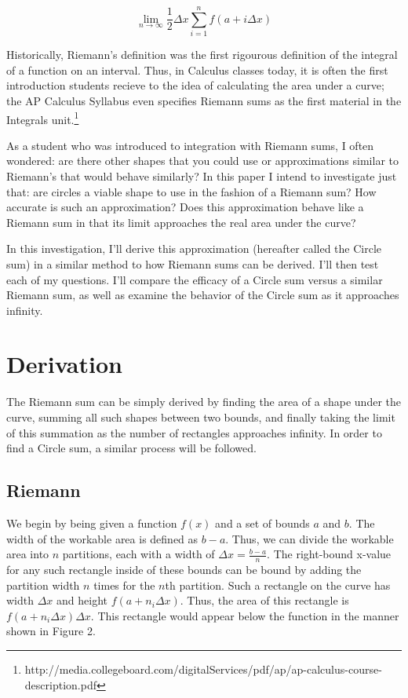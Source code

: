 \documentclass{article}
\begin{document}
    \[ \displaystyle\lim_{n \to \infty}\frac{1}{2}\Delta x\sum_{i=1}^n f(a+i\Delta x) \]

    Historically, Riemann's definition was the first rigourous definition of the integral of a function on an interval. Thus, in Calculus classes today, it is often the first introduction students recieve to the idea of calculating the area under a curve; the AP Calculus Syllabus even specifies Riemann sums as the first material in the Integrals unit.\footnote{http://media.collegeboard.com/digitalServices/pdf/ap/ap-calculus-course-description.pdf}

    As a student who was introduced to integration with Riemann sums, I often wondered: are there other shapes that you could use or approximations similar to Riemann's that would behave similarly? In this paper I intend to investigate just that: are circles a viable shape to use in the fashion of a Riemann sum? How accurate is such an approximation? Does this approximation behave like a Riemann sum in that its limit approaches the real area under the curve?

    In this investigation, I'll derive this approximation (hereafter called the Circle sum) in a similar method to how Riemann sums can be derived. I'll then test each of my questions. I'll compare the efficacy of a Circle sum versus a similar Riemann sum, as well as examine the behavior of the Circle sum as it approaches infinity.

  \section{Derivation}
    The Riemann sum can be simply derived by finding the area of a shape under the curve, summing all such shapes between two bounds, and finally taking the limit of this summation as the number of rectangles approaches infinity. In order to find a Circle sum, a similar process will be followed.

    \subsection{Riemann}
      We begin by being given a function \( f(x) \) and a set of bounds \( a \) and \( b \). The width of the workable area is defined as \( b-a \). Thus, we can divide the workable area into \( n \) partitions, each with a width of \( \Delta x = \frac{b-a}{n} \). The right-bound x-value for any such rectangle inside of these bounds can be bound by adding the partition width \( n \) times for the \(n\)th partition. Such a rectangle on the curve has width \( \Delta x \) and height \( f(a+n_i\Delta x) \). Thus, the area of this rectangle is \( f(a+n_i\Delta x)\Delta x \). This rectangle would appear below the function in the manner shown in Figure 2.
\end{document}
